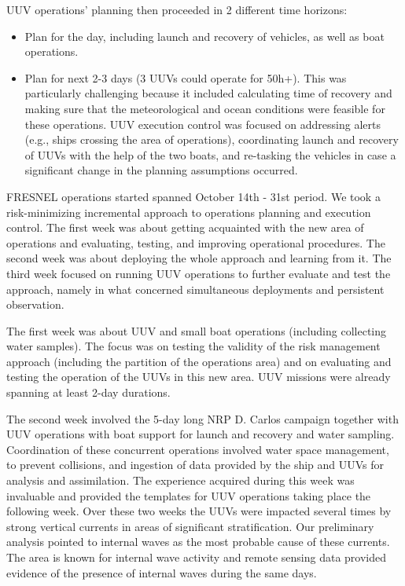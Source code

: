 UUV operations’ planning then proceeded in 2 different time horizons:
\begin{itemize}
\item Plan for the day, including launch and recovery of vehicles, as well as boat operations.
\item Plan for next 2-3 days (3 UUVs could operate for 50h+). This was particularly challenging because it included calculating time of recovery and making sure that the meteorological and ocean conditions were feasible for these operations.
UUV execution control was focused on addressing alerts (e.g., ships crossing the area of operations), coordinating launch and recovery of UUVs with the help of the two boats, and re-tasking the vehicles in case a significant change in the planning assumptions occurred. 
\end{itemize}

FRESNEL operations started spanned October 14th - 31st period. We took a risk-minimizing incremental approach to operations planning and execution control. The first week was about getting acquainted with the new area of operations and evaluating, testing, and improving operational procedures. The second week was about deploying the whole approach and learning from it. The third week focused on running UUV operations to further evaluate and test the approach, namely in what concerned simultaneous deployments and persistent observation.

The first week was about UUV and small boat operations (including collecting water samples). The focus was on testing the validity of the risk management approach (including the partition of the operations area) and on evaluating and testing the operation of the UUVs in this new area. UUV missions were already spanning at least 2-day durations.

The second week involved the 5-day long NRP D. Carlos campaign together with UUV operations with boat support for launch and recovery and water sampling. Coordination of these concurrent operations involved water space management, to prevent collisions, and ingestion of data provided by the ship and UUVs for analysis and assimilation. The experience acquired during this week was invaluable and provided the templates for UUV operations taking place the following week. Over these two weeks the UUVs were impacted several times by strong vertical currents in areas of significant stratification. Our preliminary analysis pointed to internal waves as the most probable cause of these currents. The area is known for internal wave activity and remote sensing data provided evidence of the presence of internal waves during the same days. 

